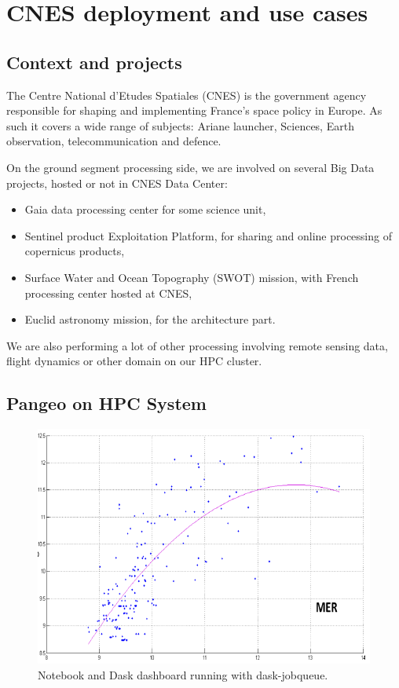 \documentclass{article}
\begin{document}
\section{CNES deployment and use cases}
\label{sec:cnes}

\subsection{Context and projects}
\label{ssec:context}

The Centre National d'Etudes Spatiales (CNES) is the government agency responsible for shaping and implementing France’s space policy in Europe. As such it covers a wide range of subjects: Ariane launcher, Sciences, Earth observation, telecommunication and defence.

On the ground segment processing side, we are involved on several Big Data projects, hosted or not in CNES Data Center:
\begin{itemize}
\item Gaia data processing center for some science unit,
\item Sentinel product Exploitation Platform, for sharing and online processing of copernicus products,
\item Surface Water and Ocean Topography (SWOT) mission, with French processing center hosted at CNES,
\item Euclid astronomy mission, for the architecture part.
\end{itemize}

We are also performing a lot of other processing involving remote sensing data, flight dynamics or other domain on our HPC cluster.

\subsection{Pangeo on HPC System}
\label{ssec:pangeohpc}

\begin{figure}
  \centering
  \includegraphics[width=\columnwidth]{dask_jobqueue.png}
  \caption{\label{dask_jobqueue} Notebook and Dask dashboard running with dask-jobqueue.}
\end{figure}
\end{document}
